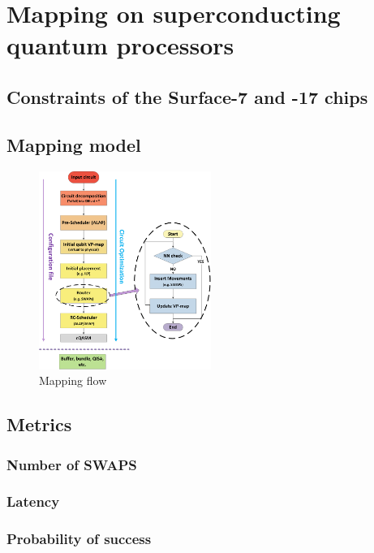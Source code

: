 
\chapter*{Mapping on superconducting quantum processors}
\label{sec:org0c3ef88}
\section*{Constraints of the Surface-7 and -17 chips}
\label{sec:org54334ec}


\section*{Mapping model}
\label{sec:org91014a3}
\begin{figure}[htbp]
\centering
\includegraphics[width=0.5\textwidth]{figures/mapping_flow2.png}
\caption{\label{fig:orgb9b8ead}
Mapping flow}
\end{figure}

\section*{Metrics}
\label{sec:org2b6d6e8}
\subsection*{Number of SWAPS}
\label{sec:orgf217daf}
\subsection*{Latency}
\label{sec:org5e72d2e}
\subsection*{Probability of success}
\label{sec:orgd9da10f}
